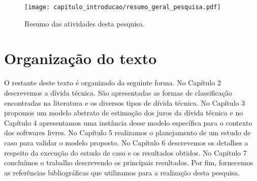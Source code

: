  \begin{figure}[H]
  \centering
  \texttt{[image: capitulo\_introducao/resumo\_geral\_pesquisa.pdf]}
  \caption{Resumo das atividades desta pesquisa.}
  \label{fig:resumo_geral_pesquisa} 
\end{figure}










\section{Organização do texto}

O restante deste texto é organizado da seguinte forma. No Capítulo 2 descrevemos a dívida técnica. São apresentadas as formas de classificação encontradas na literatura e os diversos tipos de dívida técnica. No Capítulo 3 propomos um modelo abstrato de estimação dos juros da dívida técnica e no Capítulo 4 apresentamos uma instância desse modelo específica para o contexto dos softwares livres.  No Capítulo 5 realizamos o planejamento de um estudo de caso para validar o modelo  proposto. No Capítulo 6 descrevemos os detalhes a respeito da execução do estudo de caso e os resultados obtidos.  No Capítulo 7 concluímos o trabalho descrevendo os principais resultados. Por fim, fornecemos as referências bibliográficas que utilizamos para a realização desta pesquisa.






























